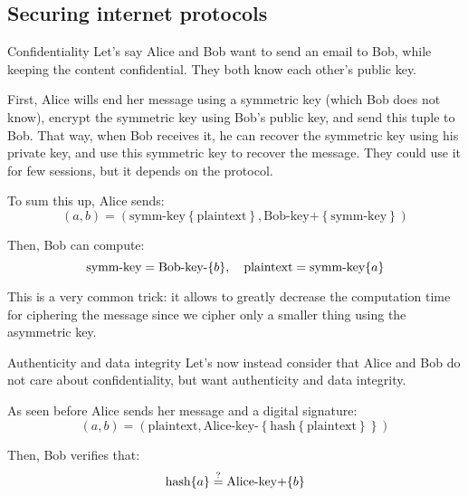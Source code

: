 \documentclass[a4paper]{article}
\begin{document}
\subsection{Securing internet protocols}
\begin{parag}{Confidentiality}
    Let's say Alice and Bob want to send an email to Bob, while keeping the content confidential. They both know each other's public key. 

    First, Alice wills end her message using a symmetric key (which Bob does not know), encrypt the symmetric key using Bob's public key, and send this tuple to Bob. That way, when Bob receives it, he can recover the symmetric key using his private key, and use this symmetric key to recover the message. They could use it for few sessions, but it depends on the protocol.

    To sum this up, Alice sends: 
    \[\left(a, b\right) = \left(\text{symm-key}\left\{\text{plaintext}\right\}, \text{Bob-key+}\left\{\text{symm-key}\right\}\right)\]

    Then, Bob can compute: 
    \[\text{symm-key} = \text{Bob-key-}\left\{b\right\}, \mathspace \text{plaintext} = \text{symm-key}\left\{a\right\}\]
    
    This is a very common trick: it allows to greatly decrease the computation time for ciphering the message since we cipher only a smaller thing using the asymmetric key. 
\end{parag}

\begin{parag}{Authenticity and data integrity}
    Let's now instead consider that Alice and Bob do not care about confidentiality, but want authenticity and data integrity.

    As seen before Alice sends her message and a digital signature: 
    \[\left(a, b\right) = \left(\text{plaintext}, \text{Alice-key-}\left\{\text{hash}\left\{\text{plaintext}\right\}\right\}\right)\]
    
    Then, Bob verifies that:
    \[\text{hash}\left\{a\right\} \over{=}{?}  \text{Alice-key+}\left\{b\right\}\]
\end{parag}
\end{document}
